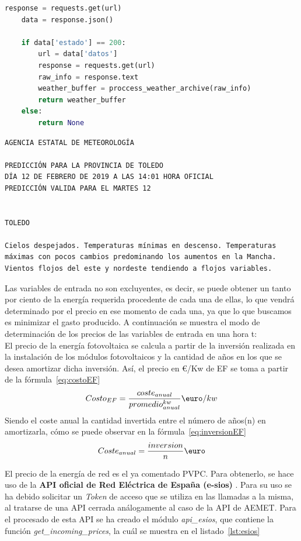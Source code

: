 \begin{itemize}
\begin{lstlisting}[language=Python,float=ht,caption={Función para obtener los valores meteorológicos de un día concreto},label={lst:aemet2}]
    response = requests.get(url)
    data = response.json()

    if data['estado'] == 200:
        url = data['datos']
        response = requests.get(url)
        raw_info = response.text
        weather_buffer = proccess_weather_archive(raw_info)
        return weather_buffer
    else:
        return None
\end{lstlisting}
\begin{lstlisting}[numbers=none,float=ht,caption={Ejemplo de respuesta de la API - AEMET para un día concreto},label={lst:APIresponse2}]
AGENCIA ESTATAL DE METEOROLOGÍA

PREDICCIÓN PARA LA PROVINCIA DE TOLEDO
DÍA 12 DE FEBRERO DE 2019 A LAS 14:01 HORA OFICIAL
PREDICCIÓN VALIDA PARA EL MARTES 12


TOLEDO

Cielos despejados. Temperaturas mínimas en descenso. Temperaturas
máximas con pocos cambios predominando los aumentos en la Mancha.
Vientos flojos del este y nordeste tendiendo a flojos variables.
\end{lstlisting}
\end{itemize}

Las variables de entrada no son excluyentes, es decir, se puede obtener un tanto por ciento de la energía requerida procedente de cada una de ellas, lo que vendrá determinado por el precio en ese momento de cada una, ya que lo que buscamos es minimizar el gasto producido. A continuación se muestra el modo de determinación de los precios de las variables de entrada en una hora t: \\

	El precio de la energía fotovoltaica se calcula a partir de la inversión realizada en la instalación de los módulos fotovoltaicos y la cantidad de años en los que se desea amortizar dicha inversión. Así, el precio en €/Kw de EF se toma a partir de la fórmula~\ref{eq:costoEF}
	\begin{equation}
          \label{eq:costoEF}
	Costo_{EF} = \frac{coste_{anual}}{promedio^{kw}_{anual}} \textup{\euro}/kw
	\end{equation}
	Siendo el coste anual la cantidad invertida entre el número de años(n) en amortizarla, cómo se puede observar en la fórmula~\ref{eq:inversionEF}
	\begin{equation}
          \label{eq:inversionEF}
	Coste_{anual} = \frac{inversion}{n} \textup{\euro}
	\end{equation}


	El precio de la energía de red es el ya comentado PVPC. Para obtenerlo, se hace uso de la \textbf{API oficial de Red Eléctrica de España (e-sios)} \cite{Ree}. Para su uso se ha debido solicitar un \textit{Token} de acceso que se utiliza en las llamadas a la misma, al tratarse de una API cerrada análogamente al caso de la API de AEMET. Para el procesado de esta API se ha creado el módulo \textit{api\_esios}, que contiene la función \textit{get\_incoming\_prices}, la cuál se muestra en el listado~\ref{lst:esios}


